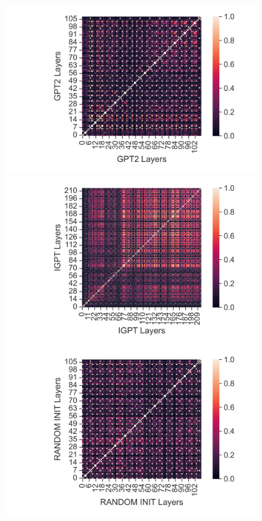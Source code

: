 \documentclass{article}
\begin{document}
\begin{figure}[H]
    \centering
    \begin{minipage}[b]{0.32\linewidth}
        \includegraphics[width=\linewidth]{figs/cka_0_0_gpt2gpt2_hopper_medium_666_state.png}
    \end{minipage}
    \begin{minipage}[b]{0.32\linewidth}
        \includegraphics[width=\linewidth]{figs/cka_0_0_igptigpt_hopper_medium_666_state.png}
    \end{minipage}
    \begin{minipage}[b]{0.32\linewidth}
        \includegraphics[width=\linewidth]{figs/cka_0_0_dtdt_hopper_medium_666_state.png}

\end{minipage}
\end{figure}
\end{document}
